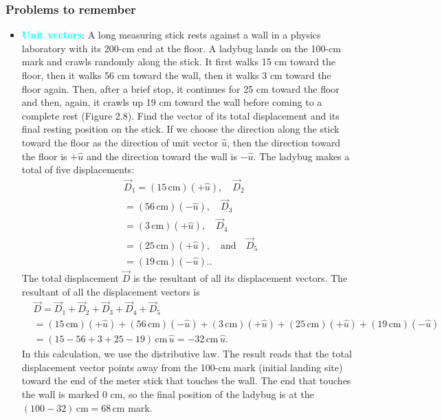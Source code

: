 \documentclass{report}
\begin{document}
    \subsubsection{Problems to remember}
    \begin{itemize}
        \item \textbf{\textcolor{cyan}{Unit vectors}}: A long measuring stick rests against a wall in a physics laboratory with its 200-cm end at the floor. A ladybug lands on the 100-cm mark and crawls randomly along the stick. It first walks 15 cm toward the floor, then it walks 56 cm toward the wall, then it walks 3 cm toward the floor again. Then, after a brief stop, it continues for 25 cm toward the floor and then, again, it crawls up 19 cm toward the wall before coming to a complete rest (Figure 2.8). Find the vector of its total displacement and its final resting position on the stick.
        \bigbreak \noindent 
        If we choose the direction along the stick toward the floor as the direction of unit vector $\hat{u}$, then the direction toward the floor is $+\hat{u}$ and the direction toward the wall is $-\hat{u}$. The ladybug makes a total of five displacements:
    \begin{align*}
        &\vec{D}_1 = (15\,\text{cm})(+\hat{u}), \quad \vec{D}_2  \\
        &= (56\,\text{cm})(-\hat{u}), \quad \vec{D}_3  \\
        &= (3\,\text{cm})(+\hat{u}), \quad \vec{D}_4  \\
        &= (25\,\text{cm})(+\hat{u}), \quad \text{and} \quad \vec{D}_5  \\
        &= (19\,\text{cm})(-\hat{u}).
    .\end{align*}
    The total displacement $\vec{D}$ is the resultant of all its displacement vectors.
    \bigbreak \noindent 
    The resultant of all the displacement vectors is
    \begin{align*}
        &\vec{D} = \vec{D}_1 + \vec{D}_2 + \vec{D}_3 + \vec{D}_4 + \vec{D}_5  \\
        &= (15\,\text{cm})(+\hat{u}) + (56\,\text{cm})(-\hat{u}) + (3\,\text{cm})(+\hat{u}) + (25\,\text{cm})(+\hat{u}) + (19\,\text{cm})(-\hat{u})  \\
        &= (15 - 56 + 3 + 25 - 19)\,\text{cm}\,\hat{u} = -32\,\text{cm}\,\hat{u}
    .\end{align*}
    In this calculation, we use the distributive law. The result reads that the total displacement vector points away from the 100-cm mark (initial landing site) toward the end of the meter stick that touches the wall. The end that touches the wall is marked 0 cm, so the final position of the ladybug is at the $(100 - 32)\,\text{cm} = 68\,\text{cm}$ mark.
    \end{itemize}
\end{document}

